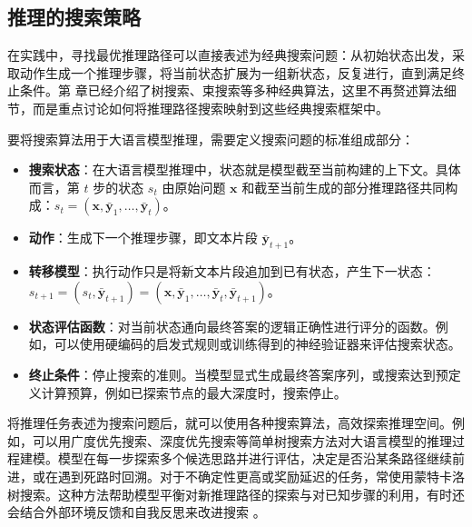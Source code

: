 \subsection{推理的搜索策略}
\label{sec:search-strategies-for-reasoning}

在实践中，寻找最优推理路径可以直接表述为经典搜索问题：从初始状态出发，采取动作生成一个推理步骤，将当前状态扩展为一组新状态，反复进行，直到满足终止条件。第 \ChapterLLMInference 章已经介绍了树搜索、束搜索等多种经典算法，这里不再赘述算法细节，而是重点讨论如何将推理路径搜索映射到这些经典搜索框架中。

要将搜索算法用于大语言模型推理，需要定义搜索问题的标准组成部分：

\begin{itemize}
\item \vspace{0.5em} \textbf{搜索状态}：在大语言模型推理中，状态就是模型截至当前构建的上下文。具体而言，第 $t$ 步的状态 $s_t$ 由原始问题 $\mathbf{x}$ 和截至当前生成的部分推理路径共同构成：$s_t = (\mathbf{x}, \bar{\mathbf{y}}_1, \dots, \bar{\mathbf{y}}_t)$。
\item \vspace{0.3em} \textbf{动作}：生成下一个推理步骤，即文本片段 $\bar{\mathbf{y}}_{t+1}$。
\item \vspace{0.3em} \textbf{转移模型}：执行动作只是将新文本片段追加到已有状态，产生下一状态：$s_{t+1} = (s_t, \bar{\mathbf{y}}_{t+1}) = (\mathbf{x}, \bar{\mathbf{y}}_1, \dots, \bar{\mathbf{y}}_t, \bar{\mathbf{y}}_{t+1})$。
\item \vspace{0.3em} \textbf{状态评估函数}：对当前状态通向最终答案的逻辑正确性进行评分的函数。例如，可以使用硬编码的启发式规则或训练得到的神经验证器来评估搜索状态。
\item \vspace{0.3em} \textbf{终止条件}：停止搜索的准则。当模型显式生成最终答案序列，或搜索达到预定义计算预算，例如已探索节点的最大深度时，搜索停止。
\end{itemize}
\vspace{0.5em}

将推理任务表述为搜索问题后，就可以使用各种搜索算法，高效探索推理空间。例如，可以用广度优先搜索、深度优先搜索等简单树搜索方法对大语言模型的推理过程建模。模型在每一步探索多个候选思路并进行评估，决定是否沿某条路径继续前进，或在遇到死路时回溯。对于不确定性更高或奖励延迟的任务，常使用蒙特卡洛树搜索。这种方法帮助模型平衡对新推理路径的探索与对已知步骤的利用，有时还会结合外部环境反馈和自我反思来改进搜索 \cite{yao-etal:2024tree,hao-etal:2023reasoning,zhou-etal:2024language}。

